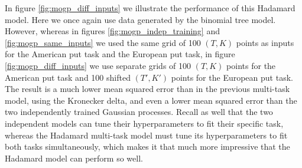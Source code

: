\documentclass[a4paper,12pt]{article}
\begin{document}
\noindent In figure \ref{fig:mogp_diff_inputs} we illustrate the performance of this Hadamard model. Here we once again use data generated by the binomial tree model. However, whereas in figures \ref{fig:mogp_indep_training} and \ref{fig:mogp_same_inputs} we used the same grid of 100 $(T, K)$ points as inputs for the American put task and the European put task, in figure \ref{fig:mogp_diff_inputs} we use separate grids of 100 $(T, K)$ points for the American put task and 100 shifted $(T', K')$ points for the European put task. The result is a much lower mean squared error than in the previous multi-task model, using the Kronecker delta, and even a lower mean squared error than the two independently trained Gaussian processes. Recall as well that the two independent models can tune their hyperparameters to fit their specific task, whereas the Hadamard multi-task model must tune its hyperparameters to fit both tasks simultaneously, which makes it that much more impressive that the Hadamard model can perform so well.
\end{document}
